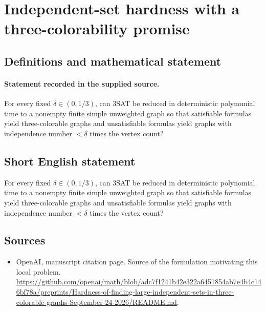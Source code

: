 \documentclass[11pt]{article}
\begin{document}
\section*{Independent-set hardness with a three-colorability promise}\label{statement}
\subsection{Definitions and mathematical statement}
\paragraph{Statement recorded in the supplied source.}
For every fixed $\delta \in (0,1/3)$, can 3SAT be reduced in deterministic polynomial time to a nonempty finite simple unweighted graph so that satisfiable formulas yield three-colorable graphs and unsatisfiable formulas yield graphs with independence number $<\delta $ times the vertex count?
\subsection{Short English statement}
For every fixed $\delta \in (0,1/3)$, can 3SAT be reduced in deterministic polynomial time to a nonempty finite simple unweighted graph so that satisfiable formulas yield three-colorable graphs and unsatisfiable formulas yield graphs with independence number $<\delta $ times the vertex count?
\subsection{Sources}
\begin{itemize}
\item[S1] OpenAI, manuscript citation page. Source of the formulation motivating this local problem.
\url{https://github.com/openai/math/blob/adc7f1241b42e322a6451854ab7e4b4c146bf78a/preprints/Hardness-of-finding-large-independent-sets-in-three-colorable-graphs-September-24-2026/README.md}.
\end{itemize}
\end{document}
